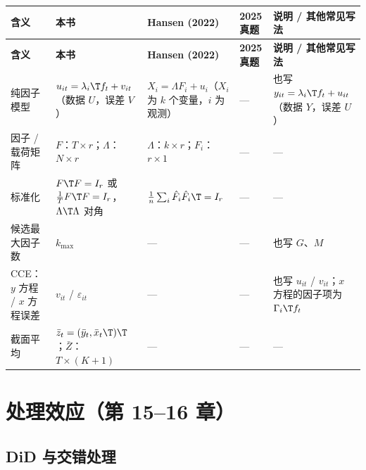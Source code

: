 {\renewcommand{\arraystretch}{1.15}\begin{longtable}{@{}>{\raggedright\arraybackslash\small}p{2.3cm}>{\raggedright\arraybackslash\small}p{3.7cm}>{\raggedright\arraybackslash\small}p{3.0cm}>{\raggedright\arraybackslash\small}p{2.2cm}>{\raggedright\arraybackslash\small}p{3.4cm}@{}}
\toprule
\textbf{含义} & \textbf{本书} & \textbf{Hansen (2022)} & \textbf{2025 真题} & \textbf{说明 / 其他常见写法}\\
\midrule
\endfirsthead
\toprule
\textbf{含义} & \textbf{本书} & \textbf{Hansen (2022)} & \textbf{2025 真题} & \textbf{说明 / 其他常见写法}\\
\midrule
\endhead
\bottomrule
\endlastfoot
纯因子模型 & $u_{it}=\lambda_i\T f_t+v_{it}$（数据 $U$，误差 $V$） & $X_i=\Lambda F_i+u_i$（$X_i$ 为 $k$ 个变量，$i$ 为观测） & — & 也写 $y_{it}=\lambda_i\T f_t+u_{it}$（数据 $Y$，误差 $U$）\\
\addlinespace[1pt]
因子 / 载荷矩阵 & $F$：$T\times r$；$\Lambda$：$N\times r$ & $\Lambda$：$k\times r$；$F_i$：$r\times 1$ & — & —\\
\addlinespace[1pt]
标准化 & $F\T F=I_r$ 或 $\frac1T F\T F=I_r$，$\Lambda\T\Lambda$ 对角 & $\frac1n\sum_i\hat F_i\hat F_i\T=I_r$ & — & —\\
\addlinespace[1pt]
候选最大因子数 & $k_{\max}$ & — & — & 也写 $G$、$M$\\
\addlinespace[1pt]
CCE：$y$ 方程 / $x$ 方程误差 & $v_{it}$ / $\varepsilon_{it}$ & — & — & 也写 $u_{it}$ / $v_{it}$；$x$ 方程的因子项为 $\Gamma_i\T f_t$\\
\addlinespace[1pt]
截面平均 & $\bar z_t=(\bar y_t,\bar x_t\T)\T$；$\bar Z$：$T\times(K+1)$ & — & — & —\\
\end{longtable}}


\section{处理效应（第 15–16 章）}\label{sec:UappD-te}

\subsection{DiD 与交错处理}

